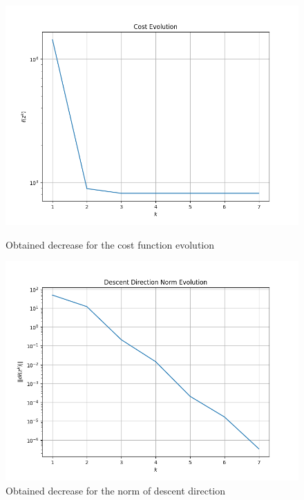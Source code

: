 \documentclass[a4paper,11pt,oneside]{book}
\begin{document}
\begin{figure}[ht]
    \begin{minipage}[t]{0.48\textwidth}
        \centering
        \includegraphics[width=\textwidth]{Cost_Evolution_T2.png}
        \caption{Obtained decrease for the cost function evolution}
        \label{fig:sinistra}
    \end{minipage}
    \hfill
    \begin{minipage}[t]{0.48\textwidth}
        \centering
        \includegraphics[width=\textwidth]{Descent_Direction_T2.png}
        \caption{Obtained decrease for the norm of descent direction}
        \label{fig:destra}
    \end{minipage}
\end{figure}
\clearpage
\end{document}
